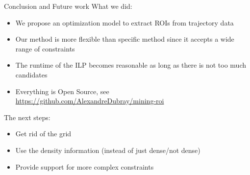 \documentclass[10pt]{beamer}
\begin{document}
\begin{frame}{Conclusion and Future work}
    What we did:
    \begin{itemize}
        \item We propose an optimization model to extract ROIs from trajectory data
        \item Our method is more flexible than specific method since it accepts a wide range of constraints
        \item The runtime of the ILP becomes reasonable as long as there is not too much candidates
        \item Everything is Open Source, see \url{https://github.com/AlexandreDubray/mining-roi}
    \end{itemize}
    The next steps:
    \begin{itemize}
        \item Get rid of the grid
        \item Use the density information (instead of just dense/not dense)
        \item Provide support for more complex constraints
    \end{itemize}
\end{frame}
\end{document}
